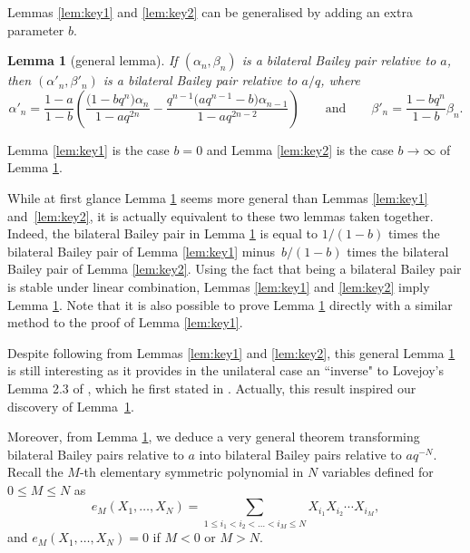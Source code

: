 \documentclass[11pt]{article}
\numberwithin{equation}{section}
\newtheorem{Lemma}[Theorem]{Lemma}
\begin{document}
Lemmas \ref{lem:key1} and \ref{lem:key2} can be generalised by adding an extra parameter $b$.
\begin{Lemma}[general lemma]\label{lem:baileylattices}
If $(\alpha_n, \beta_n)$ is a bilateral Bailey pair relative to $a$, then $(\alpha'_n, \beta'_n)$ is a bilateral Bailey pair relative to $a/q$, where
\[%
\alpha'_n=\frac{1-a}{1-b}\left(\frac{\bigl(1-bq^n\bigr) \alpha_n}{1-aq^{2n}}-\frac{q^{n-1}\bigl(aq^{n-1}-b\bigr) \alpha_{n-1}}{1-aq^{2n-2}}\right)
\qquad \text{and} \qquad \beta'_n=\frac{1-bq^n}{1-b}\beta_n.
\]
\end{Lemma}

\begin{Remark}
Lemma \ref{lem:key1} is the case $b=0$ and Lemma \ref{lem:key2} is the case $b \rightarrow \infty$ of Lemma \ref{lem:baileylattices}.
\end{Remark}

\begin{Remark}
While at first glance Lemma \ref{lem:baileylattices} seems more general than Lemmas \ref{lem:key1} and~\ref{lem:key2}, it is actually equivalent to these two lemmas taken together. Indeed, the bilateral Bailey pair in Lemma \ref{lem:baileylattices} is equal to $1/(1-b)$ times the bilateral Bailey pair of Lemma \ref{lem:key1} minus~${b/(1-b)}$ times the bilateral Bailey pair of Lemma \ref{lem:key2}. Using the fact that being a bilateral Bailey pair is stable under linear combination, Lemmas \ref{lem:key1} and \ref{lem:key2} imply Lemma \ref{lem:baileylattices}. Note that it is also possible to prove Lemma \ref{lem:baileylattices} directly with a similar method to the proof of Lemma \ref{lem:key1}.
\end{Remark}

Despite following from Lemmas \ref{lem:key1} and \ref{lem:key2}, this general Lemma \ref{lem:baileylattices} is still interesting as it provides in the unilateral case an ``inverse" to Lovejoy's Lemma 2.3 of \cite{Lo22}, which he first stated in \cite[equations (2.4) and (2.5)]{Lo04}. Actually, this result inspired our discovery of Lemma~\ref{lem:baileylattices}.


\setcounter{Theorem}{15}\setcounter{equation}{6}
Moreover, from Lemma \ref{lem:baileylattices}, we deduce a very general theorem transforming bilateral Bailey pairs relative to $a$ into bilateral Bailey pairs relative to $aq^{-N}$. Recall the $M$-th elementary symmetric polynomial in $N$ variables defined for $0 \leq M \leq N$ as
\begin{equation*}e_M(X_1, \dots , X_N)= \sum_{1\leq i_1<i_2<\dots<i_M\leq N} X_{i_1} X_{i_2}\cdots X_{i_M},
\end{equation*}
and $e_M(X_1, \dots , X_N)=0$ if $M<0$ or $M>N$.
\end{document}
